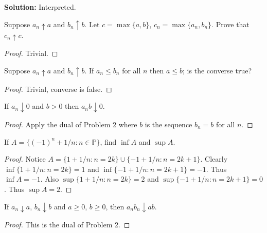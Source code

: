 \textbf{Solution: } Interpreted.

\begin{tcolorbox}[title=Problem 4, breakable]
    Suppose $a_n \uparrow a$ and $b_n \uparrow b$.
    Let $c = \max\{a, b\}$, $c_n = \max\{a_n, b_n\}$.
    Prove that $c_n \uparrow c$.
\end{tcolorbox}

\begin{proof}
    Trivial.
\end{proof}

\begin{tcolorbox}[title=Problem 5, breakable]
    Suppose $a_n \uparrow a$ and $b_n \uparrow b$.
    If $a_n \le b_n$ for all $n$ then $a \le b$;
    is the converse true?
\end{tcolorbox}

\begin{proof}
    Trivial, converse is false.
\end{proof}

\begin{tcolorbox}[title=Problem 6, breakable]
    If $a_n \downarrow 0$ and $b > 0$ then $a_n b \downarrow 0$.
\end{tcolorbox}

\begin{proof}
    Apply the dual of Problem 2 where $b$ is the sequence $b_n = b$
        for all $n$.
\end{proof}

\begin{tcolorbox}[title=Problem 7, breakable]
    If $A = \{(-1)^n + 1/n : n \in \mathbb{P}\}$,
    find $\inf A$ and $\sup A$.
\end{tcolorbox}

\begin{proof}
    Notice $A = \{1 + 1/n : n = 2k\} \cup \{-1 + 1/n : n = 2k + 1\}$.
    Clearly $\inf \{1 + 1/n : n = 2k\} = 1$
        and $\inf\{-1 + 1/n : n = 2k + 1\} = -1$.
    Thus $\inf A = -1$.
    Also $\sup \{1 + 1/n : n = 2k\} = 2$
        and $\sup\{-1 + 1/n : n = 2k + 1\} = 0$.
    Thus $\sup A = 2$.
\end{proof}

\begin{tcolorbox}[title=Problem 8, breakable]
    If $a_n \downarrow a$, $b_n \downarrow b$
     and $a \ge 0$, $b \ge 0$, then $a_n b_n \downarrow ab$.
\end{tcolorbox}

\begin{proof}
    This is the dual of Problem 2.
\end{proof}

